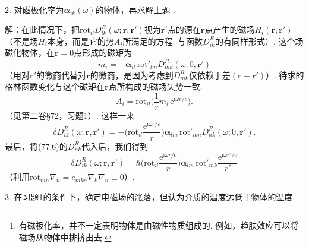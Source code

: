 \begin{xiti}
2. 对磁极化率为$\bm{\alpha}_{ik}(\omega)$的物体，再求解上题\footnote{有磁极化率，并不一定表明物体是由磁性物质组成的. 例如，趋肤效应可以将磁场从物体中排挤出去.}.

{\heiti 解：}在此情况下，把$\mathrm{rot}_{il}D_{lk}^{R}(\omega;\bm{r},\bm{r}')$视为$\bm{r}'$点的源在$\bm{r}$点产生的磁场$H_{i}(\bm{r},\bm{r}')$（不是场$H_{i}$本身，而是它的势$A_{i}$所满足的方程. 与函数$D_{ik}^{R}$的有同样形式）. 这个场磁化物体，在$\bm{r}=0$点形成的磁矩为
\begin{equation*}
m_{i}=-\bm{\alpha}_{il}\,\mathrm{rot}'_{lm}D_{mk}^{R}(\omega;0,\bm{r}')
\end{equation*}
（用对$\bm{r}'$的微商代替对$\bm{r}$的微商，是因为考虑到$D_{mk}^{R}$仅依赖于差$(\bm{r}-\bm{r}')$）. 待求的格林函数变化与这个磁矩在$\bm{r}$点所构成的磁场矢势一致.
\begin{equation*}
A_{i}=\mathrm{rot}_{il}\biggl(\frac{1}{r}m_{l}\,\mathrm{e}^{\mathrm{i}\omega r/c}\biggr).
\end{equation*}
（见第二卷§72，习题1）. 这样一来
\begin{equation*}
\delta D_{ik}^{R}(\omega;\bm{r},\bm{r}')=-\biggl(\mathrm{rot}_{il}\frac{\mathrm{e}^{\mathrm{i}\omega r/c}}{r}\biggr)\bm{\alpha}_{lm}\,\mathrm{rot}'_{mn}D_{nk}^{R}(\omega;0,\bm{r}').
\end{equation*}
最后，将(77.6)的$D_{nk}^{R}$代入后，我们得到
\begin{equation}\tag{2}
\delta D_{ik}^{R}(\omega;\bm{r},\bm{r}')=\hbar\biggl(\mathrm{rot}_{il}\frac{\mathrm{e}^{\mathrm{i}\omega r/c}}{r}\biggr)\bm{\alpha}_{lm}\,\mathrm{rot}'_{mk}\frac{\mathrm{e}^{\mathrm{i}\omega r'/c}}{r'}
\end{equation}
（利用$\mathrm{rot}_{mn}\nabla_{n}=e_{mkn}\nabla_{k}\nabla_{n}\equiv0$）.

3. 在习题1的条件下，确定电磁场的涨落，但认为介质的温度远低于物体的温度.


\end{xiti}
